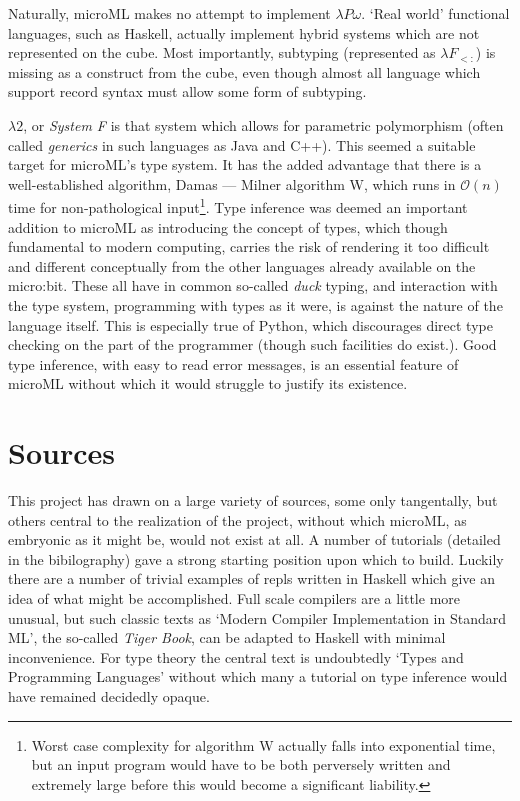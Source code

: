 \documentclass[12pt, a4paper]{report}
\begin{document}
Naturally, microML makes no attempt to implement $\lambda P\omega$. `Real world' functional
languages, such as Haskell, actually implement hybrid systems which are not represented on the cube.
Most importantly, subtyping (represented as $\lambda F_{<:}$) is missing as a construct from the cube, 
even though almost all language which support record syntax must allow some form of subtyping.

$\lambda 2$, or \textit{System F} is that system which allows for parametric polymorphism (often
called \textit{generics} in such languages as Java and C++). This seemed a suitable target for
microML's type system. It has the added advantage that there is a well-established algorithm, Damas
--- Milner algorithm W, which runs in $\mathcal{O}(n)$ time for non-pathological input\footnote{Worst case
    complexity for algorithm W actually falls into exponential time, but an input program would have
    to be both perversely written and extremely large before this would become a significant
    liability.}. Type inference was deemed an important addition to microML as introducing the
concept of types, which though fundamental to modern computing, carries the risk of rendering it too
difficult and different conceptually from the other languages already available on the micro:bit.
These all have in common so-called \textit{duck} typing, and interaction with the type system,
programming with types as it were, is against the nature of the language itself. This is especially
true of Python, which discourages direct type checking on the part of the programmer (though such
facilities do exist.). Good type inference, with easy to read error messages, is an essential
feature of microML without which it would struggle to justify its existence.

\section{Sources}
This project has drawn on a large variety of sources, some only tangentally, but others central to
the realization of the project, without which microML, as embryonic as it might be, would not exist
at all. A number of tutorials (detailed in the bibilography) gave a strong starting position upon
which to build. Luckily there are a number of trivial examples of repls written in Haskell which
give an idea of what might be accomplished. Full scale compilers are a little more unusual, but such
classic texts as `Modern Compiler Implementation in Standard ML', the so-called \textit{Tiger Book},
can be adapted to Haskell with minimal inconvenience. For type theory the central text is
undoubtedly `Types and Programming Languages' without which many a tutorial on type inference would
have remained decidedly opaque.
\end{document}
